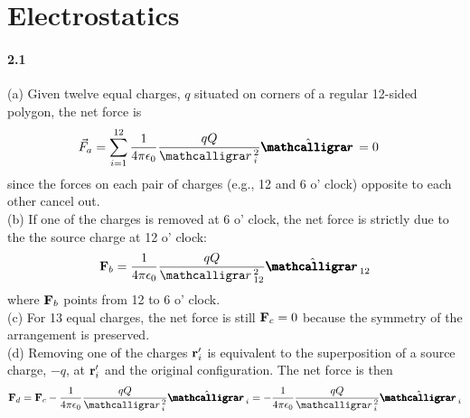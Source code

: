 \documentclass[../main.tex]{subfiles}
\begin{document}
\section{Electrostatics}
\barh 

\paragraph{2.1}
(a) Given twelve equal charges, $q$ situated on corners of a regular 12-sided polygon, 
the net force is
\begin{align*}
    \vec{F}_a &= \sum_{i=1}^{12} \frac{1}{4\pi\epsilon_0} 
        \frac{qQ}{\scriptr_{i}^2} \hat \boldscriptr = 0
\end{align*}
since the forces on each pair of charges (e.g., 12 and 6 o' clock) opposite to each other 
cancel out. \\
(b) If one of the charges is removed at 6 o' clock, the net force is strictly due to the the source
charge at 12 o' clock:
\begin{align*}
    \vb{F}_b = \frac{1}{4\pi\epsilon_0} \frac{qQ}{\scriptr_{12}^2} \hat \boldscriptr_{12}
\end{align*}
where $\vb{F}_b$ points from 12 to 6 o' clock. \\
(c) For 13 equal charges, the net force is still $\vb{F}_c = 0$ because the symmetry of the
arrangement is preserved. \\
(d) Removing one of the charges $\vb{r}'_i$ is equivalent to the superposition of a source charge,
$-q$, at $\vb{r}'_i$ and the original configuration. The net force is then
\begin{align*}
    \vb{F}_d = \vb{F}_c - \frac{1}{4\pi\epsilon_0} \frac{qQ}{\scriptr_{i}^2} \hat \boldscriptr_{i}
    = -\frac{1}{4\pi\epsilon_0} \frac{qQ}{\scriptr_{i}^2} \hat \boldscriptr_{i}
\end{align*}
\end{document}
